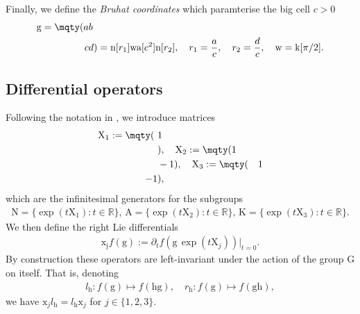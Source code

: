 \documentclass[12pt]{amsart}
\theoremstyle{definition}
\theoremstyle{remark}
\numberwithin{equation}{section}
\newcommand{\G}{\mathrm{G}}
\newcommand{\R}{{\mathbb R}}
\newcommand{\1}{{\mathbf 1}}
\renewcommand{\exp}{\operatorname{exp}}
\renewcommand{\a}{\mathrm{a}}
\newcommand{\n}{\mathrm{n}}
\newcommand{\g}{\mathrm{g}}
\newcommand{\h}{\mathrm{h}}
\renewcommand{\n}{\mathrm{n}}
\begin{document}
Finally, we define the \emph{Bruhat coordinates} which paramterise the big cell $c > 0$
\begin{align} \label{eq:bruhat}
    \g= \mqty(a& b \\ c& d) = \n[r_1] \mathrm{w} \a[c^2] \n[r_2], \quad r_1= \frac{a}{c}, \quad r_2=\frac{d}{c}, \quad \mathrm{w} = \mathrm{k}[\pi/2].
\end{align}

\subsection{Differential operators}
Following the notation in \cite{motohashielements},
we introduce matrices
\begin{align*}
    \mathrm{X}_1 := \mqty(\,\,&1 \\ \,\, &),  \quad \mathrm{X}_2 := \mqty(1& \\ &-1), \quad  \mathrm{X}_3 := \mqty( & 1 \\ -1 & ),
\end{align*}
which are the infinitesimal generators for the subgroups
\begin{align*}
    \mathrm{N} = \{\exp( t \mathrm{X}_1): t \in \R\}, \,    \mathrm{A} = \{\exp( t \mathrm{X}_2): t \in \R\}, \, \mathrm{K} = \{\exp( t \mathrm{X}_3): t \in \R\}.
\end{align*}
We then define the right Lie differentials
\begin{align*}
    \mathrm{x_j}f(\g) := \partial_t f(\g \,\exp(t \mathrm{X}_j)) |_{t=0}.
\end{align*}
By construction these operators are left-invariant under the action of the group $\G$ on itself. That is, denoting
\begin{align}\label{eq:lrdef}
    l_\h: f(\g) \mapsto f(\h\g), \quad r_\h: f(\g) \mapsto f(\g \h),
\end{align}
we have $\mathrm{x}_j l_\h=l_\h\mathrm{x}_j$ for $j\in\{1,2,3\}$.
\end{document}
